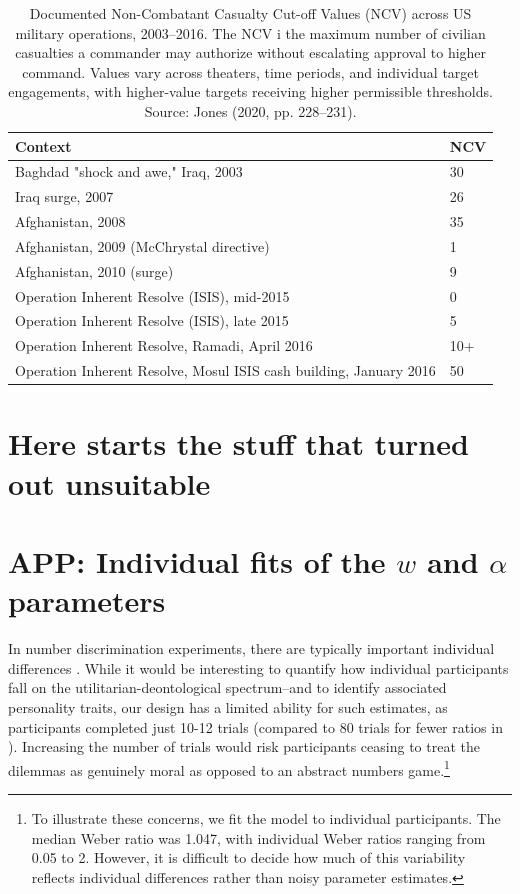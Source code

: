 \documentclass[
]{article}
\begin{document}
\begin{table}

\caption{\label{tab:print-ncv-table}Documented Non-Combatant Casualty Cut-off Values (NCV) across US military operations, 2003–2016. The NCV i the maximum number of civilian casualties a commander may authorize without escalating approval to higher command. Values vary across theaters, time periods, and individual target engagements, with higher-value targets receiving higher permissible thresholds. Source: Jones (2020, pp. 228–231).}
\centering
\begin{tabular}[t]{ll}
\toprule
Context & NCV\\
\midrule
Baghdad "shock and awe," Iraq, 2003 & 30\\
Iraq surge, 2007 & 26\\
Afghanistan, 2008 & 35\\
Afghanistan, 2009 (McChrystal directive) & 1\\
Afghanistan, 2010 (surge) & 9\\
\addlinespace
Operation Inherent Resolve (ISIS), mid-2015 & 0\\
Operation Inherent Resolve (ISIS), late 2015 & 5\\
Operation Inherent Resolve, Ramadi, April 2016 & 10+\\
Operation Inherent Resolve, Mosul ISIS cash building, January 2016 & 50\\
\bottomrule
\end{tabular}
\end{table}

\clearpage

\section{Here starts the stuff that turned out unsuitable}\label{here-starts-the-stuff-that-turned-out-unsuitable}

\section{\texorpdfstring{APP: Individual fits of the \(w\) and \(\alpha\) parameters}{APP: Individual fits of the w and \textbackslash alpha parameters}}\label{app-individual-fits-of-the-w-and-alpha-parameters}

In number discrimination experiments, there are typically important individual differences \autocite{Halberda2008,BarrettoGarcia2023,Khaw2020}. While it would be interesting to quantify how individual participants fall on the utilitarian-deontological spectrum--and to identify associated personality traits, our design has a limited ability for such estimates, as participants completed just 10-12 trials (compared to 80 trials for fewer ratios in \autocite{Halberda2008}). Increasing the number of trials would risk participants ceasing to treat the dilemmas as genuinely moral as opposed to an abstract numbers game.\footnote{To illustrate these concerns, we fit the model to individual participants. The median Weber ratio was 1.047, with individual Weber ratios ranging from 0.05 to 2. However, it is difficult to decide how much of this variability reflects individual differences rather than noisy parameter estimates.}
\end{document}
